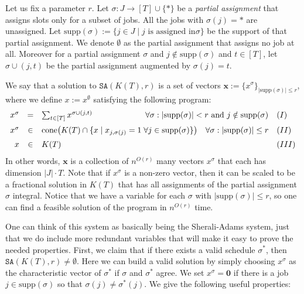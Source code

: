 \documentclass[11pt,letterpaper,oneside,english]{article}
\theoremstyle{theorem}
\begin{document}
Let us fix a
parameter $r$.
Let $\sigma : J \to [T] \cup \{ *\}$ be a \emph{partial assignment} that
assigns slots
only for a subset of jobs. All the jobs with $\sigma(j) = *$ are unassigned.
Let $\textrm{supp}(\sigma) := \{ j \in J \mid j\textrm{ is assigned in
}\sigma\}$ be the support of that partial
assignment. We denote $\emptyset$ as the partial assignment that assigns
no job at all.
Moreover for a partial assignment $\sigma$ and $j \notin
\textrm{supp}(\sigma)$ and $t \in [T]$,
let $\sigma \cup (j,t)$ be the partial assignment augmented by
$\sigma(j) = t$.


We say that a solution to $\texttt{SA}(K(T),r)$ is a set of vectors 
$\bm{x} := \{x^\sigma\}_{|\textrm{supp}(\sigma)| \leq r}$,
where we define $x := x^\emptyset$
satisfying the following program:
\[
\begin{array}{rclll}
  x^{\sigma} &=& \sum_{t \in [T]} x^{\sigma \cup (j,t)} \hspace{2.3cm} \forall
\sigma: |\textrm{supp}(\sigma)| < r\textrm{ and }j \notin
\textrm{supp}(\sigma) & (I) \vspace{2mm} \\
  x^{\sigma} &\in& \textrm{cone}\big(K(T) \cap \{ x \mid x_{j,\sigma(j)} = 1 \;
\forall j \in \textrm{supp}(\sigma) \}\big) \quad \forall \sigma:
|\textrm{supp}(\sigma)| \leq r & (II) \vspace{2mm} \\
x &\in& K(T) & (III)
\end{array}
\]
In other words, $\bm{x}$ is a collection of $n^{O(r)}$ many vectors $x^{\sigma}$
that each has dimension $|J| \cdot T$.
Note that if $x^{\sigma}$ is a non-zero vector, then it can be scaled to be a 
fractional solution in $K(T)$ that has all assignments of the partial assignment $\sigma$
integral. 
Notice that we have a variable for each $\sigma$ with $|\textrm{supp}(\sigma)| \leq r$, 
so one can find a feasible solution of the program in $n^{O(r)}$ time. 

One can think of this system as basically being the Sherali-Adams system, just that 
we do include more redundant variables that will make it easy to prove the needed
properties. 
First, we claim that if there exists a valid schedule $\sigma^*$, then
$\texttt{SA}(K(T),r) \neq \emptyset$. Here we can build a valid solution
by simply choosing $x^{\sigma}$ as the
characteristic vector of $\sigma^*$
if $\sigma$ and $\sigma^*$ agree. We set $x^{\sigma} = \bm{0}$ if there
is a job $j \in \textrm{supp}(\sigma)$ so that $\sigma(j) \neq \sigma^*(j)$.
We give the following useful properties:
\end{document}
